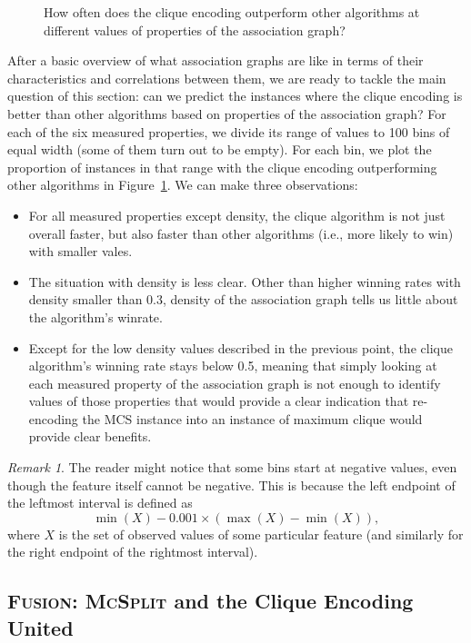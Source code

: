 \documentclass{l4proj}
\theoremstyle{definition}
\theoremstyle{remark}
\newtheorem{remark}{Remark}[chapter]
\begin{document}
\begin{figure}
\begin{subfigure}[t]{0.49\textwidth}
  \end{subfigure}
  \caption{How often does the clique encoding outperform other algorithms at
    different values of properties of the association graph?}
  \label{fig:bins}
\end{figure}

After a basic overview of what association graphs are like in terms of their
characteristics and correlations between them, we are ready to tackle the main
question of this section: can we predict the instances where the clique encoding
is better than other algorithms based on properties of the association graph?
For each of the six measured properties, we divide its range of values to 100
bins of equal width (some of them turn out to be empty). For each bin, we plot
the proportion of instances in that range with the clique encoding outperforming
other algorithms in Figure~\ref{fig:bins}. We can make three observations:

\begin{itemize}
\item For all measured properties except density, the clique algorithm is not
  just overall faster, but also faster than other algorithms (i.e., more likely
  to win) with smaller vales.
\item The situation with density is less clear. Other than higher winning rates
  with density smaller than 0.3, density of the association graph tells us
  little about the algorithm's winrate.
\item Except for the low density values described in the previous point, the
  clique algorithm's winning rate stays below 0.5, meaning that simply looking
  at each measured property of the association graph is not enough to identify
  values of those properties that would provide a clear indication that
  re-encoding the MCS instance into an instance of maximum clique would provide
  clear benefits.
\end{itemize}

\begin{remark}
  The reader might notice that some bins start at negative values, even though
  the feature itself cannot be negative. This is because the left endpoint of
  the leftmost interval is defined as
  \[ \min(X) - 0.001 \times (\max(X) - \min(X)), \]
  where $X$ is the set of observed values of some particular feature \cite{R}
  (and similarly for the right endpoint of the rightmost interval).
\end{remark}

\subsection{\textsc{Fusion}: \textsc{McSplit} and the Clique Encoding United}
\end{document}
